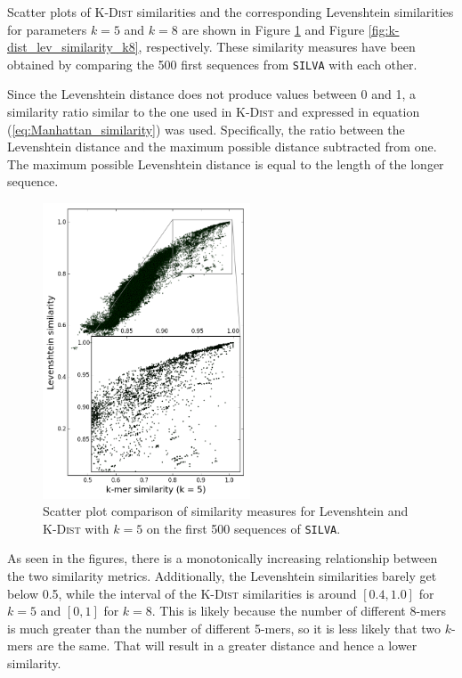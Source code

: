 Scatter plots of \textsc{K-Dist} similarities and the corresponding Levenshtein
similarities for parameters $k=5$ and $k=8$ are shown in Figure
\ref{fig:k-dist_lev_similarity_k5} and Figure
\ref{fig:k-dist_lev_similarity_k8}, respectively. These similarity measures
have been obtained by comparing the 500 first sequences from \texttt{SILVA}
with each other.

Since the Levenshtein distance does not produce values between 0 and 1, a
similarity ratio similar to the one used in \textsc{K-Dist} and expressed in
equation (\ref{eq:Manhattan_similarity}) was used. Specifically, the ratio
between the Levenshtein distance and the maximum possible distance subtracted
from one. The maximum possible Levenshtein distance is equal to the length of
the longer sequence.

\begin{figure}
  \includegraphics[width=0.55\textwidth]{graphics/Levenshtein_K-Dist_k5.png}
  \caption{Scatter plot comparison of similarity measures for Levenshtein and
    \textsc{K-Dist} with $k=5$ on the first 500 sequences of \texttt{SILVA}.}
  \label{fig:k-dist_lev_similarity_k5}
\end{figure}

As seen in the figures, there is a monotonically increasing relationship
between the two similarity metrics. Additionally, the Levenshtein similarities
barely get below 0.5, while the interval of the \textsc{K-Dist} similarities is
around $[0.4,1.0]$ for $k=5$ and $[0,1]$ for $k=8$. This is likely because the
number of different 8-mers is much greater than the number of different 5-mers,
so it is less likely that two $k$-mers are the same. That will result in a
greater distance and hence a lower similarity.


